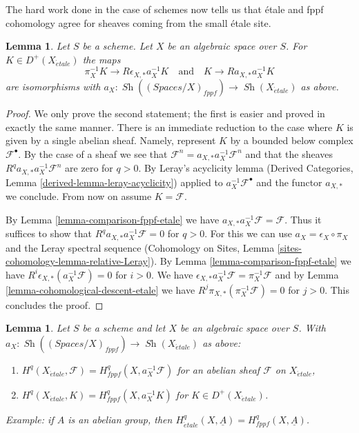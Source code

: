 \documentclass{stacks-project}
\theoremstyle{plain}
\newtheorem{lemma}[subsection]{Lemma}
\theoremstyle{definition}
\theoremstyle{remark}
\numberwithin{equation}{subsection}
\def\Sh{\mathop{\mathit{Sh}}\nolimits}
\def\etale{{\acute{e}tale}}
\begin{document}
\noindent
The hard work done in the case of schemes now tells us that
\'etale and fppf cohomology agree for sheaves coming from the
small \'etale site.

\begin{lemma}
\label{lemma-cohomological-descent-etale-fppf}
Let $S$ be a scheme. Let $X$ be an algebraic space over $S$.
For $K \in D^+(X_\etale)$ the maps
$$
\pi_X^{-1}K \longrightarrow R\epsilon_{X, *}a_X^{-1}K
\quad\text{and}\quad
K \longrightarrow Ra_{X, *}a_X^{-1}K
$$
are isomorphisms with
$a_X : \Sh((\textit{Spaces}/X)_{fppf}) \to \Sh(X_\etale)$ as above.
\end{lemma}

\begin{proof}
We only prove the second statement; the first is easier and proved in exactly
the same manner.
There is an immediate reduction to the case where
$K$ is given by a single abelian sheaf. Namely, represent $K$
by a bounded below complex $\mathcal{F}^\bullet$. By the case of a
sheaf we see that
$\mathcal{F}^n = a_{X, *} a_X^{-1} \mathcal{F}^n$
and that the sheaves $R^qa_{X, *}a_X^{-1}\mathcal{F}^n$
are zero for $q > 0$. By Leray's acyclicity lemma
(Derived Categories, Lemma \ref{derived-lemma-leray-acyclicity})
applied to $a_X^{-1}\mathcal{F}^\bullet$
and the functor $a_{X, *}$ we conclude. From now on assume $K = \mathcal{F}$.

\medskip\noindent
By Lemma \ref{lemma-comparison-fppf-etale} we have
$a_{X, *}a_X^{-1}\mathcal{F} = \mathcal{F}$. Thus it suffices to show that
$R^qa_{X, *}a_X^{-1}\mathcal{F} = 0$ for $q > 0$.
For this we can use $a_X = \epsilon_X \circ \pi_X$ and
the Leray spectral sequence
(Cohomology on Sites, Lemma \ref{sites-cohomology-lemma-relative-Leray}).
By Lemma \ref{lemma-comparison-fppf-etale}
we have $R^i\epsilon_{X, *}(a_X^{-1}\mathcal{F}) = 0$ for $i > 0$.
We have
$\epsilon_{X, *}a_X^{-1}\mathcal{F} = \pi_X^{-1}\mathcal{F}$
and by Lemma \ref{lemma-cohomological-descent-etale} we have
$R^j\pi_{X, *}(\pi_X^{-1}\mathcal{F}) = 0$ for $j > 0$.
This concludes the proof.
\end{proof}

\begin{lemma}
\label{lemma-compare-cohomology-etale-fppf}
Let $S$ be a scheme and let $X$ be an algebraic space over $S$.
With $a_X : \Sh((\textit{Spaces}/X)_{fppf}) \to \Sh(X_\etale)$
as above:
\begin{enumerate}
\item $H^q(X_\etale, \mathcal{F}) = H^q_{fppf}(X, a_X^{-1}\mathcal{F})$
for an abelian sheaf $\mathcal{F}$ on $X_\etale$,
\item $H^q(X_\etale, K) = H^q_{fppf}(X, a_X^{-1}K)$ for $K \in D^+(X_\etale)$.
\end{enumerate}
Example: if $A$ is an abelian group, then
$H^q_\etale(X, \underline{A}) = H^q_{fppf}(X, \underline{A})$.
\end{lemma}
\end{document}
